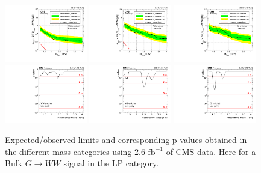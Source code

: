 \begin{figure}[h!]
\centering
\includegraphics[width=0.32\textwidth]{figures/analysis/search1/AN-15-211/limits/brazilianFlag_BulkWW_WWLP_13TeV_wPDF.pdf}
\includegraphics[width=0.32\textwidth]{figures/analysis/search1/AN-15-211/limits/brazilianFlag_BulkWW_WZLP_13TeV_wPDF.pdf}
\includegraphics[width=0.32\textwidth]{figures/analysis/search1/AN-15-211/limits/brazilianFlag_BulkWW_ZZLP_13TeV_wPDF.pdf}\\
\includegraphics[width=0.32\textwidth]{figures/analysis/search1/AN-15-211/pvalues/pvalue_BulkWWinWW_low_purity.pdf}
\includegraphics[width=0.32\textwidth]{figures/analysis/search1/AN-15-211/pvalues/pvalue_BulkWWinWZ_low_purity.pdf}
\includegraphics[width=0.32\textwidth]{figures/analysis/search1/AN-15-211/pvalues/pvalue_BulkWWinZZ_low_purity.pdf}
\caption{Expected/observed limits and corresponding p-values obtained in the different mass categories using 2.6 $\textrm{fb}^{-1}$ of CMS data. Here for a Bulk $G\rightarrow WW$ signal in the LP category.}
\label{fig:searchI:Limits_LPBulkWW}
\end{figure}



